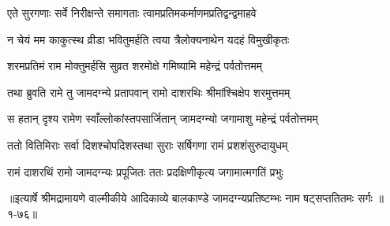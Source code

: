 \twolineshloka
{एते सुरगणाः सर्वे निरीक्षन्ते समागताः}
{त्वामप्रतिमकर्माणमप्रतिद्वन्द्वमाहवे} %

\twolineshloka
{न चेयं मम काकुत्स्थ व्रीडा भवितुमर्हति}
{त्वया त्रैलोक्यनाथेन यदहं विमुखीकृतः} %

\twolineshloka
{शरमप्रतिमं राम मोक्तुमर्हसि सुव्रत}
{शरमोक्षे गमिष्यामि महेन्द्रं पर्वतोत्तमम्} %

\twolineshloka
{तथा ब्रुवति रामे तु जामदग्न्ये प्रतापवान्}
{रामो दाशरथिः श्रीमांश्चिक्षेप शरमुत्तमम्} %

\twolineshloka
{स हतान् दृश्य रामेण स्वाँल्लोकांस्तपसार्जितान्}
{जामदग्न्यो जगामाशु महेन्द्रं पर्वतोत्तमम्} %

\twolineshloka
{ततो वितिमिराः सर्वा दिशश्चोपदिशस्तथा}
{सुराः सर्षिगणा रामं प्रशशंसुरुदायुधम्} %

\twolineshloka
{रामं दाशरथिं रामो जामदग्न्यः प्रपूजितः}
{ततः प्रदक्षिणीकृत्य जगामात्मगतिं प्रभुः} %


॥इत्यार्षे श्रीमद्रामायणे वाल्मीकीये आदिकाव्ये बालकाण्डे जामदग्न्यप्रतिष्टम्भः नाम षट्सप्ततितमः सर्गः ॥१-७६॥
